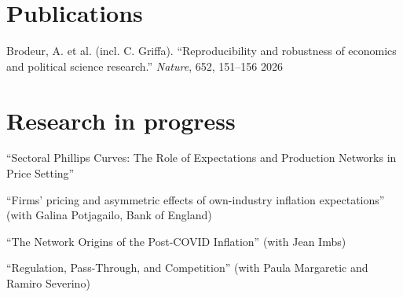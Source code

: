 \documentclass[11pt,letterpaper]{article}%
\begin{document}
\section*{Publications}
\vspace{-0.2cm}
\begin{list}{}{} 
\setlength\itemsep{0.1cm}
\itemindent=-15pt
\item Brodeur, A. et al. (incl. C. Griffa). ``Reproducibility and robustness of economics and political science research.'' \textit{Nature}, 652, 151--156 \hfill {2026} 
\end{list}

\section*{Research in progress}
\vspace{-0.2cm}
\begin{list}{}{} 
\setlength\itemsep{0.1cm}
\itemindent=-15pt
\item``Sectoral Phillips Curves: The Role of Expectations and Production Networks in Price Setting''
\item ``Firms’ pricing and asymmetric effects of own-industry inflation expectations'' (with Galina Potjagailo, Bank of England)
\item ``The Network Origins of the Post-COVID Inflation'' (with Jean Imbs)
\item ``Regulation, Pass-Through, and Competition'' (with Paula Margaretic and Ramiro Severino)
\end{list}
\end{document}
